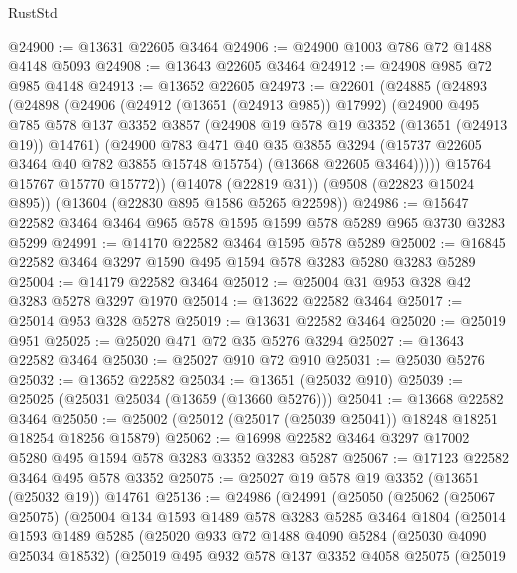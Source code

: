 \begin{lexlean}{RustStd}
\begin{coremodule}
@24900 := @13631 @22605 @3464
@24906 := @24900 @1003 @786 @72 @1488 @4148 @5093
@24908 := @13643 @22605 @3464
@24912 := @24908 @985 @72 @985 @4148
@24913 := @13652 @22605
@24973 := @22601
    (@24885
      (@24893
        (@24898
          (@24906
            (@24912 (@13651 (@24913 @985)) @17992)
            (@24900
              @495
              @785
              @578
              @137
              @3352
              @3857
              (@24908 @19 @578 @19 @3352 (@13651 (@24913 @19)) @14761)
              (@24900
                @783
                @471
                @40
                @35
                @3855
                @3294
                (@15737 @22605 @3464 @40 @782 @3855 @15748 @15754)
                (@13668 @22605 @3464)))))
        @15764
        @15767
        @15770
        @15772))
    (@14078 (@22819 @31))
    (@9508 (@22823 @15024 @895))
    (@13604 (@22830 @895 @1586 @5265 @22598))
@24986 := @15647 @22582 @3464 @3464 @965 @578 @1595 @1599 @578 @5289 @965 @3730 @3283 @5299
@24991 := @14170 @22582 @3464 @1595 @578 @5289
@25002 := @16845 @22582 @3464 @3297 @1590 @495 @1594 @578 @3283 @5280 @3283 @5289
@25004 := @14179 @22582 @3464
@25012 := @25004 @31 @953 @328 @42 @3283 @5278 @3297 @1970
@25014 := @13622 @22582 @3464
@25017 := @25014 @953 @328 @5278
@25019 := @13631 @22582 @3464
@25020 := @25019 @951
@25025 := @25020 @471 @72 @35 @5276 @3294
@25027 := @13643 @22582 @3464
@25030 := @25027 @910 @72 @910
@25031 := @25030 @5276
@25032 := @13652 @22582
@25034 := @13651 (@25032 @910)
@25039 := @25025 (@25031 @25034 (@13659 (@13660 @5276)))
@25041 := @13668 @22582 @3464
@25050 := @25002 (@25012 (@25017 (@25039 @25041)) @18248 @18251 @18254 @18256 @15879)
@25062 := @16998 @22582 @3464 @3297 @17002 @5280 @495 @1594 @578 @3283 @3352 @3283 @5287
@25067 := @17123 @22582 @3464 @495 @578 @3352
@25075 := @25027 @19 @578 @19 @3352 (@13651 (@25032 @19)) @14761
@25136 := @24986
    (@24991
      (@25050
        (@25062
          (@25067 @25075)
          (@25004
            @134
            @1593
            @1489
            @578
            @3283
            @5285
            @3464
            @1804
            (@25014
              @1593
              @1489
              @5285
              (@25020
                @933
                @72
                @1488
                @4090
                @5284
                (@25030 @4090 @25034 @18532)
                (@25019
                  @495
                  @932
                  @578
                  @137
                  @3352
                  @4058
                  @25075
                  (@25019

\end{coremodule}
\end{lexlean}
